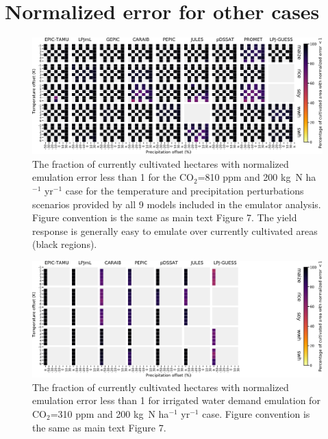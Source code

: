 \documentclass[10pt]{article}
\begin{document}
{{\clearpage
\section{Normalized error for other cases}

\begin{figure}[h!]
  \centering
  \includegraphics[width=15.5cm]{error_grid_810.png}
  \caption{
  The fraction of currently cultivated hectares with normalized emulation error less than 1 for the CO$_2$=810 ppm and 200 kg~N ha$^{-1}$ yr$^{-1}$ case for the temperature and precipitation perturbations scenarios provided by all 9 models included in the emulator analysis. 
  Figure convention is the same as main text Figure 7.
  The yield response is generally easy to emulate over currently cultivated areas (black regions).
  }
  \label{fig:error810}
\end{figure}

\begin{figure}[h!]
  \centering
  \includegraphics[width=15.5cm]{error_grid_360_cultivated_IWD.png}
  \caption{
  The fraction of currently cultivated hectares with normalized emulation error less than 1 for irrigated water demand emulation for CO$_2$=310 ppm and 200 kg~N ha$^{-1}$ yr$^{-1}$ case. Figure convention is the same as main text Figure 7.
  }
  \label{fig:error810}
\end{figure}

\clearpage
}}
\end{document}
